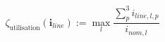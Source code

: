 \begin{equation}
	\zeta_\text{utilisation}(\textbf{i}_{line}) := \max_l{\frac{\sum_p^3i_{line,l,p}}{i_{nom,l}}}
	\label{ch1:equ:cable-utilisation}
\end{equation}